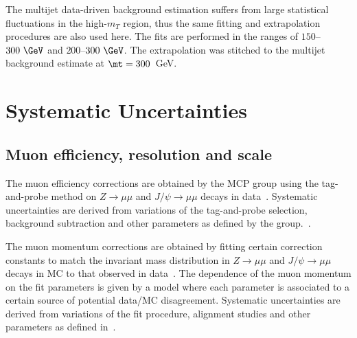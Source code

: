 The multijet data-driven background estimation suffers from large statistical fluctuations in the high-$m_T$ region, thus the same fitting and extrapolation procedures are also used here.
The fits are performed in the ranges of $150$--$300~\GeV$ and $200$--$300~\GeV$.
The extrapolation was stitched to the multijet background estimate at $\mt=300$~GeV.



\section{Systematic Uncertainties}
\label{sec:wprimeSystematics}
\subsection{Muon efficiency, resolution and scale}
The muon efficiency corrections are obtained by the MCP group using the tag-and-probe method on $Z\to\mu\mu$ and $J/\psi\to\mu\mu$ decays in data~\cite{MCP13TeV}. Systematic uncertainties
are derived from variations of the tag-and-probe selection, background subtraction and other parameters as defined by the group.~\cite{MCPrun1}.

The muon momentum corrections are obtained by fitting certain correction constants 
to match the invariant mass distribution in $Z\to\mu\mu$ and $J/\psi\to\mu\mu$ decays in MC
to that observed in data~\cite{MCP13TeV}. The dependence of the muon momentum on the fit parameters
is given by a model where each parameter is associated to a certain source of potential data/MC disagreement.
Systematic uncertainties are derived from variations of the fit procedure, alignment studies and other parameters as defined in~\cite{MCPrun1}.

